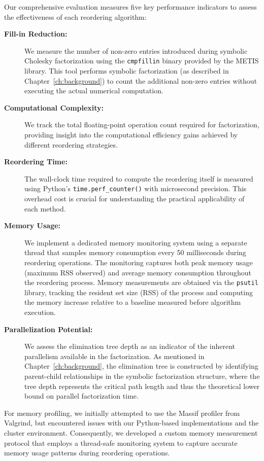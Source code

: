 Our comprehensive evaluation measures five key performance indicators to assess the effectiveness of each reordering algorithm:

\begin{description}
   \item[\textbf{Fill-in Reduction:}] We measure the number of non-zero entries introduced during symbolic Cholesky factorization using the \texttt{cmpfillin} binary provided by the METIS library. This tool performs symbolic factorization (as described in Chapter~\ref{ch:background}) to count the additional non-zero entries without executing the actual numerical computation. 
      
      \item[\textbf{Computational Complexity:}] We track the total floating-point operation count required for factorization, providing insight into the computational efficiency gains achieved by different reordering strategies.
      
      \item[\textbf{Reordering Time:}] The wall-clock time required to compute the reordering itself is measured using Python's \texttt{time.perf\_counter()} with microsecond precision. This overhead cost is crucial for understanding the practical applicability of each method.
      
      \item[\textbf{Memory Usage:}] We implement a dedicated memory monitoring system using a separate thread that samples memory consumption every 50 milliseconds during reordering operations. The monitoring captures both peak memory usage (maximum RSS observed) and average memory consumption throughout the reordering process. Memory measurements are obtained via the \texttt{psutil} library, tracking the resident set size (RSS) of the process and computing the memory increase relative to a baseline measured before algorithm execution.

      \item[\textbf{Parallelization Potential:}] We assess the elimination tree depth as an indicator of the inherent parallelism available in the factorization. As mentioned in Chapter~\ref{ch:background}, the elimination tree is constructed by identifying parent-child relationships in the symbolic factorization structure, where the tree depth represents the critical path length and thus the theoretical lower bound on parallel factorization time.
\end{description}

For memory profiling, we initially attempted to use the Massif profiler from Valgrind, but encountered issues with our Python-based implementations and the cluster environment. Consequently, we developed a custom memory measurement protocol that employs a thread-safe monitoring system to capture accurate memory usage patterns during reordering operations.

